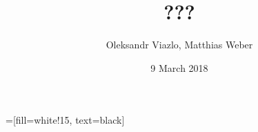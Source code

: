 \documentclass[8pt]{beamer}
\newif\ifplacelogo %
\begin{document}
\newcommand{\backupbegin}{
   \newcounter{finalframe}
   \setcounter{finalframe}{\value{framenumber}}
}
\newcommand{\backupend}{
   \setcounter{framenumber}{\value{finalframe}}
}

\newcommand{\myNode}{\tikz[baseline,inner sep=1pt] \node[anchor=base]}

 =[fill=white!15, text=black]



\title[ ??? \hspace{13.5em}\insertframenumber/
\inserttotalframenumber]{ ??? }


	\author[Oleksandr Viazlo, Matthias Weber]{Oleksandr Viazlo, Matthias Weber \\ 
	}
	
       
	\date{9 March 2018}


	
   	\frame{\titlepage}

   	

\placelogofalse
\end{document}
